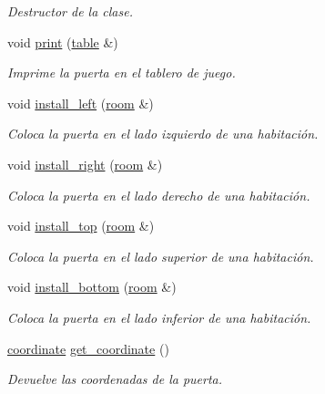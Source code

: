 \begin{DoxyCompactItemize}
\begin{DoxyCompactList}\small\item\em Destructor de la clase. \end{DoxyCompactList}\item 
void \hyperlink{classdoor_a981a3e9dc87aacbcf0dd1db664c3201e}{print} (\hyperlink{classtable}{table} \&)
\begin{DoxyCompactList}\small\item\em Imprime la puerta en el tablero de juego. \end{DoxyCompactList}\item 
void \hyperlink{classdoor_a4b42cce1c8ba8d24c776a21a35d6025d}{install\-\_\-left} (\hyperlink{classroom}{room} \&)
\begin{DoxyCompactList}\small\item\em Coloca la puerta en el lado izquierdo de una habitación. \end{DoxyCompactList}\item 
void \hyperlink{classdoor_a03da0ce330ce024ce80830638064a317}{install\-\_\-right} (\hyperlink{classroom}{room} \&)
\begin{DoxyCompactList}\small\item\em Coloca la puerta en el lado derecho de una habitación. \end{DoxyCompactList}\item 
void \hyperlink{classdoor_ac4639081f6bcdccd9413b7d296042325}{install\-\_\-top} (\hyperlink{classroom}{room} \&)
\begin{DoxyCompactList}\small\item\em Coloca la puerta en el lado superior de una habitación. \end{DoxyCompactList}\item 
void \hyperlink{classdoor_a443af5d482482b52554bb45ea3f5de34}{install\-\_\-bottom} (\hyperlink{classroom}{room} \&)
\begin{DoxyCompactList}\small\item\em Coloca la puerta en el lado inferior de una habitación. \end{DoxyCompactList}\item 
\hyperlink{structcoordinate}{coordinate} \hyperlink{classdoor_a0a9e142597bb11cab8bb2e806148682c}{get\-\_\-coordinate} ()
\begin{DoxyCompactList}\small\item\em Devuelve las coordenadas de la puerta. \end{DoxyCompactList}\end{DoxyCompactItemize}


